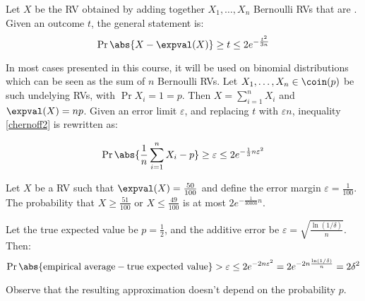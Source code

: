 \begin{defn}
Let $X$ be the RV obtained by adding together $X_1, \dots, X_n$ Bernoulli RVs that are \iid. Given an outcome $t$, the general statement is:
\begin{equation}\label{chernoff2}
    \Pr{\abs{X - \expval(X)} \geq t} \leq 2e^{-\frac{t^2}{3n}}
\end{equation}
\end{defn}

In most cases presented in this course, it will be used on binomial distributions which can be seen as the sum of $n$ \iid{} Bernoulli RVs. Let $X_1, \dots, X_n \in \coin(p)$ be such undelying RVs, with $\Pr{X_i = 1} = p$. Then $X = \sum_{i = 1}^{n} X_i$ and $\expval(X) = np$. Given an error limit $\varepsilon$, and replacing $t$ with $\varepsilon n$, inequality \ref{chernoff2} is rewritten as:

\begin{equation}
    \Pr{\abs{\frac{1}{n}\sum_{i = 1}^{n} X_i - p} \geq \varepsilon} \leq 2e^{-\frac{1}{3}n\varepsilon^2}
\end{equation}


\ex Let $X$ be a RV such that $\expval(X) = \frac{50}{100}$ and define the error margin $\varepsilon = \frac{1}{100}$. The probability that $X \geq \frac{51}{100}$ or $X \leq \frac{49}{100}$ is at most $2e^{-\frac{1}{30000}n}$.
    
\ex Let the true expected value be $p = \frac{1}{2}$, and the additive error be $\varepsilon = \sqrt{\frac{\ln(1/\delta)}{n}}$. Then:
\[
    \Pr{\abs{\text{empirical average} - \text{true expected value}} > \varepsilon} \leq 2e^{-2n\varepsilon^2} = 2e^{-2n \frac{\ln(1/\delta)}{n}} = 2 \delta^2
\]
    
Observe that the resulting approximation doesn't depend on the probability $p$.
